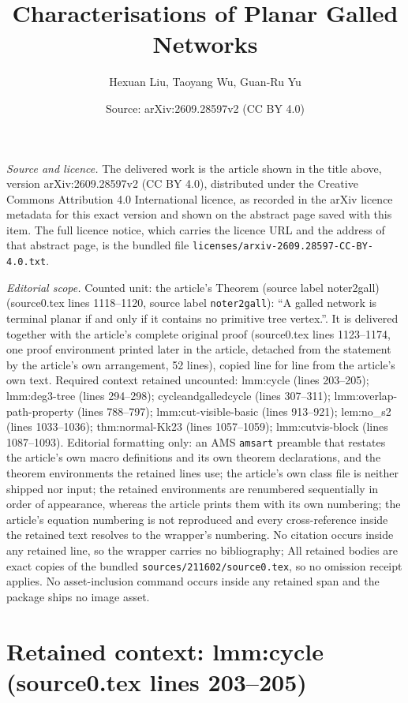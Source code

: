 \documentclass[10pt,a4paper]{amsart}
\title[Characterisations of Planar Galled Networks]{Characterisations of Planar Galled Networks}
\author{Hexuan Liu, Taoyang Wu, Guan-Ru Yu}
\date{Source: arXiv:2609.28597v2 (CC BY 4.0)}
\theoremstyle{plain}
\theoremstyle{thmstyleone}
\theoremstyle{thmstyletwo}
\theoremstyle{thmstylethree}
\begin{document}
\maketitle

\noindent\emph{Source and licence.} The delivered work is the article shown in the title above, version arXiv:2609.28597v2 (CC BY 4.0), distributed under the Creative Commons Attribution 4.0 International licence, as recorded in the arXiv licence metadata for this exact version and shown on the abstract page saved with this item. The full licence notice, which carries the licence URL and the address of that abstract page, is the bundled file \texttt{licenses/arxiv-2609.28597-CC-BY-4.0.txt}.
\par\smallskip

\noindent\textit{Editorial scope.} Counted unit: the article's Theorem (source label noter2gall) (source0.tex lines 1118--1120, source label \texttt{noter2gall}): ``A galled network is terminal planar if and only if it contains no primitive tree vertex.''. It is delivered together with the article's complete original proof (source0.tex lines 1123--1174, one proof environment printed later in the article, detached from the statement by the article's own arrangement, 52 lines), copied line for line from the article's own text. Required context retained uncounted: lmm:cycle (lines 203--205); lmm:deg3-tree (lines 294--298); cycleandgalledcycle (lines 307--311); lmm:overlap-path-property (lines 788--797); lmm:cut-visible-basic (lines 913--921); lem:no\_s2 (lines 1033--1036); thm:normal-Kk23 (lines 1057--1059); lmm:cutvis-block (lines 1087--1093). Editorial formatting only: an AMS \texttt{amsart} preamble that restates the article's own macro definitions and its own theorem declarations, and the theorem environments the retained lines use; the article's own class file is neither shipped nor input; the retained environments are renumbered sequentially in order of appearance, whereas the article prints them with its own numbering; the article's equation numbering is not reproduced and every cross-reference inside the retained text resolves to the wrapper's numbering. No citation occurs inside any retained line, so the wrapper carries no bibliography; All retained bodies are exact copies of the bundled \texttt{sources/211602/source0.tex}, so no omission receipt applies. No asset-inclusion command occurs inside any retained span and the package ships no image asset.


\section*{Retained context: lmm:cycle (source0.tex lines 203--205)}
\end{document}
